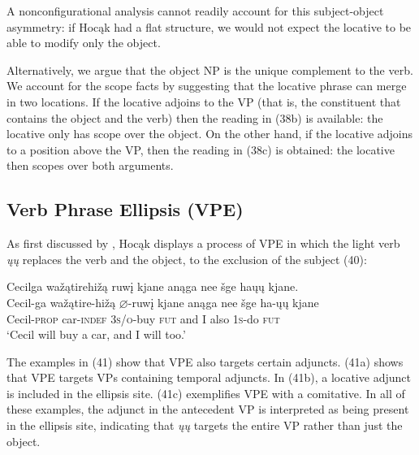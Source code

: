 \documentclass[output=paper]{LSP/langsci}
\begin{document}
A nonconfigurational analysis cannot readily account for this subject-object asymmetry: if Hoc\k{a}k had a flat structure, we would not expect the locative to be able to modify only the object.
	
Alternatively, we argue that the object NP is the unique complement to the verb. We account for the scope facts by suggesting that the locative phrase can merge in two locations. If the locative adjoins to the VP (that is, the constituent that contains the object and the verb) then the reading in (38b) is available: the locative only has scope over the object. On the other hand, if the locative adjoins to a position above the VP, then the reading in (38c) is obtained: the locative then scopes over both arguments.

\subsection{Verb Phrase Ellipsis (VPE)}

As first discussed by \citet{Johnson2013}, Hoc\k{a}k displays a process of VPE in which the light verb \textit{\k{u}\k{u}} replaces the verb and the object, to the exclusion of the subject (40):

\begin{exe}
\ex 
\glll Cecilga	wa\v{z}\k{a}tirehi\v{z}\k{a}		ruw\k{i}	kjane		an\k{a}ga	nee		\v{s}ge		ha\k{u}\k{u}			kjane.\\
Cecil-ga	wa\v{z}\k{a}tire-hi\v{z}\k{a}	$\varnothing$-ruw\k{i}		kjane		an\k{a}ga	nee	\v{s}ge ha-\k{u}\k{u}		kjane \\
Cecil-\textsc{prop}		car-\textsc{indef}			\textsc{3s/o}-buy		\textsc{fut}	and	I	also	\textsc{1s}-do	\textsc{fut} \\
\trans `Cecil will buy a car, and I will too.'
\end{exe}

The examples in (41) show that VPE also targets certain adjuncts. (41a) shows that VPE targets VPs containing temporal adjuncts. In (41b), a locative adjunct is included in the ellipsis site. (41c) exemplifies VPE with a comitative. In all of these examples, the adjunct in the antecedent VP is interpreted as being present in the ellipsis site, indicating that \textit{\k{u}\k{u}} targets the entire VP rather than just the object.
\end{document}
